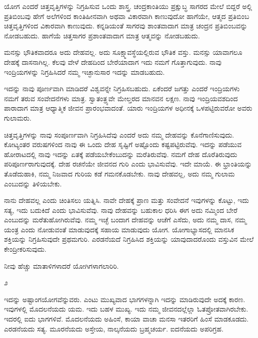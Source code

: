 ಯೋಗ ಎಂದರೆ ಚಿತ್ತವೃತ್ತಿಗಳನ್ನು ನಿಗ್ರಹಿಸುವ ಒಂದು ಶಾಸ್ತ್ರ. ಚಂದ್ರಕಾಂತಿಯು ಪ್ರಕ್ಷುಬ್ಧ ಸಾಗರದ ಮೇಲೆ ಬಿದ್ದರೆ ಅಲ್ಲಿ ಪ್ರತಿಬಿಂಬವು ಹೇಗೆ ಅಲೆಗಳಿಂದ ಕಾಂತಿಹೀನವಾಗಿ ಅಥವಾ ವಿಕಾರವಾಗಿ ಕಾಣುವುದೋ ಹಾಗೆಯೇ, ಆತ್ಮದ ಪ್ರತಿಬಿಂಬ ಚಿತ್ತವೃತ್ತಿಗಳಿಂದ ವಿಕಾರವಾಗಿ ಕಾಣುವುದು. ಕನ್ನಡಿಯಂತೆ ಸಾಗರವು ಶಾಂತವಾದಾಗ ಮಾತ್ರ ಚಂದ್ರನ ಪ್ರತಿಬಿಂಬವನ್ನು ನೋಡಬಹುದು. ಹಾಗೆಯೆ ಚಿತ್ತಸಾಗರ ಪ್ರಶಾಂತವಾದಾಗ ಮಾತ್ರ ಆತ್ಮವನ್ನು ನೋಡಬಹುದು.

\newpage

ಮನಸ್ಸು ಭೌತಿಕವಾದರೂ ಅದು ದೇಹವಲ್ಲ. ಅದು ಸೂಕ್ಷ್ಮಾವಸ್ಥೆಯಲ್ಲಿರುವ ಭೌತಿಕ ವಸ್ತು. ಮನಸ್ಸು ಯಾವಾಗಲೂ ದೇಹಕ್ಕೆ ದಾಸನಾಗಿಲ್ಲ. ಕೆಲವು ವೇಳೆ ದೇಹದಿಂದ ಬೇರೆಯಾದಾಗ ಇದು ನಮಗೆ ಗೊತ್ತಾಗುವುದು. ನಾವು ಇಂದ್ರಿಯಗಳನ್ನು ನಿಗ್ರಹಿಸಿದರೆ ನಮ್ಮ ಇಚ್ಛಾನುಸಾರ ಇದನ್ನು ಮಾಡಬಹುದು.

ಇದನ್ನು ನಾವು ಪೂರ್ಣವಾಗಿ ಮಾಡಿದರೆ ವಿಶ್ವವನ್ನೇ ನಿಗ್ರಹಿಸಬಹುದು. ಏಕೆಂದರೆ ಜಗತ್ತು ಎಂದರೆ ಇಂದ್ರಿಯಗಳು ನಮಗೆ ತರುವ ಸಂವೇದನೆಗಳು ಮಾತ್ರ. ಸ್ವಾತಂತ್ರ್ಯವೇ ಮೇಲ್ತರದ ಮಾನವನ ಲಕ್ಷಣ. ನಾವು ಇಂದ್ರಿಯವಶದಿಂದ ಪಾರಾದಾಗ ಮಾತ್ರ ಆಧ್ಯಾತ್ಮಿಕ ಜೀವನ ಪ್ರಾರಂಭವಾದಂತೆ. ಯಾರು ಇಂದ್ರಿಯಗಳ ಅಧೀನಕ್ಕೆ ಒಳಪಟ್ಟಿರುವರೋ ಅವರು ಗುಲಾಮರು.

ಚಿತ್ತವೃತ್ತಿಗಳನ್ನು ನಾವು ಸಂಪೂರ್ಣವಾಗಿ ನಿಗ್ರಹಿಸಿದೆವು ಎಂದರೆ ಅದು ನಮ್ಮ ದೇಹವನ್ನು ಕೊನೆಗಾಣಿಸುವುದು. ಕೋಟ್ಯಂತರ ವರುಷಗಳಿಂದ ನಾವು ಈ ಒಂದು ದೇಹ ಸೃಷ್ಟಿಗೆ ಅಷ್ಟೊಂದು ಕಷ್ಟಪಟ್ಟಿರುವೆವು. ಇದನ್ನು ಪಡೆಯುವ ಹೋರಾಟದಲ್ಲಿ ನಾವು ಇದನ್ನು ಏತಕ್ಕೆ ಪಡೆಯಬೇಕೆಂಬುದನ್ನು ಮರೆತಿರುವೆವು. ನಮಗೆ ದೇಹ ದೊರೆತಿರುವುದು ಪರಿಪೂರ್ಣರಾಗುವುದಕ್ಕೆ. ದೇಹ ರಚನೆಯೇ ಜೀವನದ ಗುರಿ ಎಂದು ಭಾವಿಸುವೆವು. ಇದೇ ಮಾಯೆ. ಈ ಭ್ರಾಂತಿಯನ್ನು ತೊಡೆದುಹಾಕಿ, ನಮ್ಮ ನಿಜವಾದ ಗುರಿಯ ಕಡೆ ಗಮನಕೊಡಬೇಕು. ನಾವು ದೇಹವಲ್ಲ, ಅದು ನಮ್ಮ ಗುಲಾಮ ಎಂಬುದನ್ನು ತಿಳಿಯಬೇಕು.

ನಾನು ದೇಹವಲ್ಲ ಎಂದು ಚಿಂತಿಸಲು ಯತ್ನಿಸಿ. ನಾವೇ ದೇಹಕ್ಕೆ ಪ್ರಾಣ ಮತ್ತು ಸಂವೇದನೆ ಇವುಗಳನ್ನು ಕೊಟ್ಟು, ಇದು ಸತ್ಯ, ಇದು ಬದುಕಿದೆ ಎಂದು ಭಾವಿಸುವೆವು. ನಾವು ದೇಹವನ್ನು ಬಹುಕಾಲ ಧರಿಸಿ ಈಗ ಅದು ನಮ್ಮಿಂದ ಬೇರೆ ಎಂಬುದನ್ನು ಮರೆತುಹೋಗಿರುವೆವು. ನಮ್ಮ ಇಚ್ಛೆ ಬಂದಾಗ ದೇಹವನ್ನು ಆಚೆಗೆ ಎಸೆದು, ಅದು ನಮ್ಮ ದಾಸ, ನಮ್ಮ ಯಂತ್ರ ಎಂದು ನೋಡುವಂತೆ ಮಾಡುವುದಕ್ಕೆ ಸಹಾಯ ಮಾಡುವುದು ಯೋಗ. ಯೋಗಾಭ್ಯಾಸದಲ್ಲಿ ಮಾನಸಿಕ ಶಕ್ತಿಯನ್ನು ನಿಗ್ರಹಿಸುವುದೇ ಪ್ರಥಮಗುರಿ. ಎರಡನೆಯದೆ ನಿಗ್ರಹಿಸಿದ ಶಕ್ತಿಯನ್ನು ಯಾವುದಾದರೊಂದು ವಸ್ತುವಿನ ಮೇಲೆ ಕೇಂದ್ರೀಕರಿಸುವುದು.

ನೀವು ಹೆಚ್ಚು ಮಾತಾಳಿಗಳಾದರೆ ಯೋಗಿಗಳಾಗಲಾರಿರಿ.

\begin{center}
೨
\end{center}

ಇದನ್ನು ಅಷ್ಟಾಂಗಯೋಗವೆನ್ನುವರು. ಎಂಟು ಮುಖ್ಯವಾದ ಭಾಗಗಳನ್ನಾಗಿ ಇದನ್ನು ಮಾಡಿರುವುದೇ ಅದಕ್ಕೆ ಕಾರಣ. ಇವುಗಳಲ್ಲಿ ಮೊದಲನೆಯದು ಯಮ. ಇದು ಬಹಳ ಮುಖ್ಯ. ಇದು ನಮ್ಮ ಜೀವನದಲ್ಲೆಲ್ಲಾ ಓತಪ್ರೋತವಾಗಿರಬೇಕು. ಇದರಲ್ಲಿ ಐದು ಭಾಗಗಳಿವೆ. ಮೊದಲನೆಯದು ಅಹಿಂಸೆ, ಕಾಯಾ ವಾಚಾ ಮನಸಾ ಇತರರಿಗೆ ಹಿಂಸೆ ಮಾಡಕೂಡದು. ಎರಡನೆಯದು ಸತ್ಯ. ಮೂರನೆಯದು ಅಸ್ತೇಯ, ನಾಲ್ಕನೆಯದು ಬ್ರಹ್ಮಚರ್ಯ. ಐದನೆಯದು ಅಪರಿಗ್ರಹ.

\vskip 2pt

